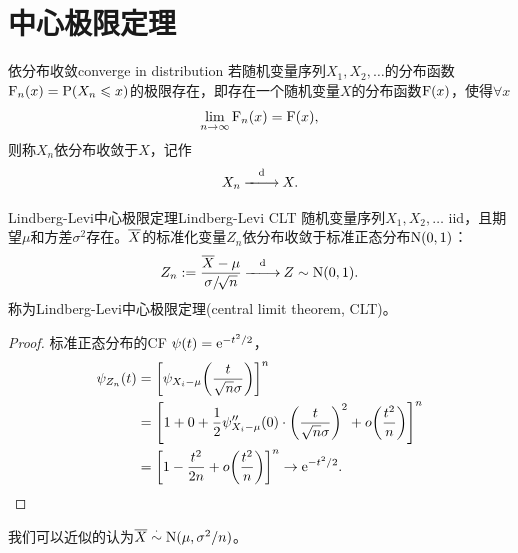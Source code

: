\section{中心极限定理}

\begin{definition}
	{依分布收敛}{converge in distribution}
	若随机变量序列$X_1,X_2,\ldots$的分布函数$\operatorname{F}_n(x)=\operatorname{P}(X_n\leqslant x)$的极限存在，即存在一个随机变量$X$的分布函数$\operatorname{F}(x)$，使得$\forall x$
	\[
		\lim_{n\to\infty}\operatorname{F}_n(x)=\operatorname{F}(x),
	\]
	则称$X_n$依分布收敛于$X$，记作
	\begin{equation}
		X_n\overset{\text{d}}{-\hspace{-4pt}-\hspace{-5pt}\longrightarrow} X.
	\end{equation}
\end{definition}

\begin{theorem}{Lindberg-Levi中心极限定理}{Lindberg-Levi CLT}
	随机变量序列$X_1, X_2,\ldots$ iid，且期望$\mu$和方差$\sigma^2$存在。$\overline{X}$的标准化变量$Z_n$依分布收敛于标准正态分布$\operatorname{N}(0,1)$：
	\begin{equation}
		Z_n:=\frac{\avg X-\mu}{\sigma/\!\sqrt n}%
		\dto Z\sim\Norm(0,1).
	\end{equation}
	称为Lindberg-Levi中心极限定理(central limit theorem, CLT)。
\end{theorem}
\begin{proof}
	标准正态分布的CF $\psi(t)=\mathop{}\!\mathrm{e}^{-t^2/2}$，%
	\begin{align*}
		\psi_{Z_n}(t)&=\left[\psi_{X_i-\mu}\biggl(\frac{t}{\sqrt n\sigma}\biggr)\right]^n\\
		&=\left[1+0+\frac12\psi''_{X_i-\mu}(0)\cdot\biggl(\frac{t}{\sqrt n\sigma}\biggr)^2+o\biggl(\frac{t^2}n\biggr)\right]^n\\
		&=\left[1-\frac{t^2}{2n}+o\biggl(\frac{t^2}n\biggr)\right]^n\to\mathop{}\!\mathrm{e}^{-t^2/2}.
		\qedhere
	\end{align*}
\end{proof}

\begin{corollary}
	我们可以近似的认为$\overline{X}\overset\cdot\sim\operatorname{N}(\mu,\sigma^2/n)$。
\end{corollary}


